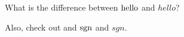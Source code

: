 \documentclass{article}
\begin{document}
What is the difference between $\mathrm{hello}$ and $hello$?

Also, check out \CWT and $\mathrm{sgn}$ and $sgn$.
\end{document}
